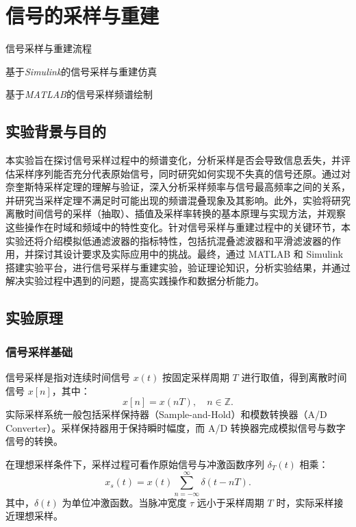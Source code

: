 \chapter{信号的采样与重建}

\begin{introduction}
  \item 信号采样与重建流程
  \item 基于\textit{Simulink}的信号采样与重建仿真
  \item 基于\textit{MATLAB}的信号采样频谱绘制
\end{introduction}

\section{实验背景与目的}
  

本实验旨在探讨信号采样过程中的频谱变化，分析采样是否会导致信息丢失，并评估采样序列能否充分代表原始信号，同时研究如何实现不失真的信号还原。通过对奈奎斯特采样定理的理解与验证，深入分析采样频率与信号最高频率之间的关系，并研究当采样定理不满足时可能出现的频谱混叠现象及其影响。此外，实验将研究离散时间信号的采样（抽取）、插值及采样率转换的基本原理与实现方法，并观察这些操作在时域和频域中的特性变化。针对信号采样与重建过程中的关键环节，本实验还将介绍模拟低通滤波器的指标特性，包括抗混叠滤波器和平滑滤波器的作用，并探讨其设计要求及实际应用中的挑战。最终，通过 MATLAB 和 Simulink 搭建实验平台，进行信号采样与重建实验，验证理论知识，分析实验结果，并通过解决实验过程中遇到的问题，提高实践操作和数据分析能力。

\section{实验原理}

\subsection{信号采样基础}
信号采样是指对连续时间信号 $x(t)$ 按固定采样周期 $T$ 进行取值，得到离散时间信号 $x[n]$，其中：
\begin{equation}
    x[n] = x(nT), \quad n \in \mathbb{Z}.
\end{equation}
实际采样系统一般包括采样保持器（Sample-and-Hold）和模数转换器（A/D Converter）。采样保持器用于保持瞬时幅度，而 A/D 转换器完成模拟信号与数字信号的转换。

在理想采样条件下，采样过程可看作原始信号与冲激函数序列 $\delta_T (t)$ 相乘：
\begin{equation}
    x_s (t) = x(t) \sum_{n=-\infty}^{\infty} \delta (t - nT).
\end{equation}
其中，$\delta (t)$ 为单位冲激函数。当脉冲宽度 $\tau$ 远小于采样周期 $T$ 时，实际采样接近理想采样。

